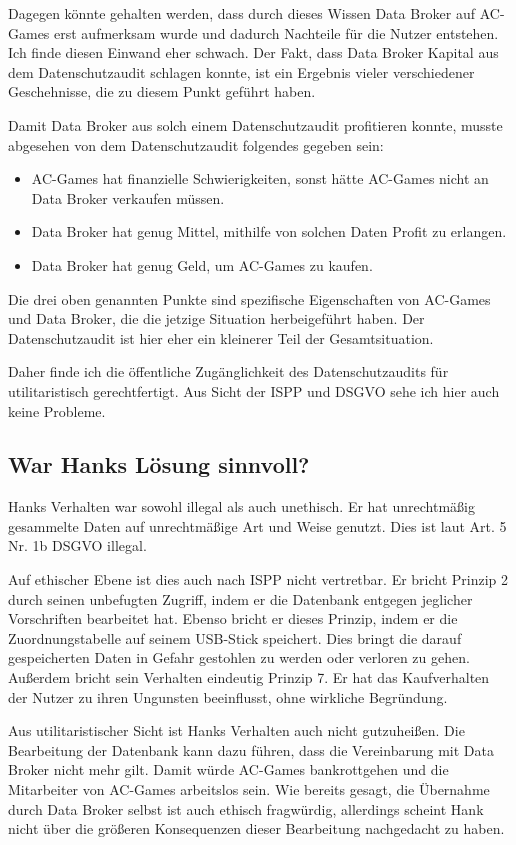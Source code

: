 Dagegen könnte gehalten werden, dass durch dieses Wissen Data Broker auf AC-Games erst aufmerksam wurde und dadurch Nachteile für die Nutzer entstehen. Ich finde diesen Einwand eher schwach. Der Fakt, dass Data Broker Kapital aus dem Datenschutzaudit schlagen konnte, ist ein Ergebnis vieler verschiedener Geschehnisse, die zu diesem Punkt geführt haben.

Damit Data Broker aus solch einem Datenschutzaudit profitieren konnte, musste abgesehen von dem Datenschutzaudit folgendes gegeben sein:
\begin{itemize}
    \item AC-Games hat finanzielle Schwierigkeiten, sonst hätte AC-Games nicht an Data Broker verkaufen müssen. 
    \item Data Broker hat genug Mittel, mithilfe von solchen Daten Profit zu erlangen.
    \item Data Broker hat genug Geld, um AC-Games zu kaufen.
\end{itemize}
Die drei oben genannten Punkte sind spezifische Eigenschaften von AC-Games und Data Broker, die die jetzige Situation herbeigeführt haben. 
Der Datenschutzaudit ist hier eher ein kleinerer Teil der Gesamtsituation.

Daher finde ich die öffentliche Zugänglichkeit des Datenschutzaudits für utilitaristisch gerechtfertigt. Aus Sicht der ISPP und DSGVO sehe ich hier auch keine Probleme.

\subsection*{War Hanks Lösung sinnvoll? \cite{kees_faites_2017}}

Hanks Verhalten war sowohl illegal als auch unethisch.
Er hat unrechtmäßig gesammelte Daten auf unrechtmäßige Art und Weise genutzt.
Dies ist laut Art. 5 Nr. 1b DSGVO illegal.

Auf ethischer Ebene ist dies auch nach ISPP nicht vertretbar.
Er bricht Prinzip 2 durch seinen unbefugten Zugriff, indem er die Datenbank entgegen jeglicher Vorschriften bearbeitet hat. Ebenso bricht er dieses Prinzip, indem er die Zuordnungstabelle auf seinem USB-Stick speichert.
Dies bringt die darauf gespeicherten Daten in Gefahr gestohlen zu werden oder verloren zu gehen.
Außerdem bricht sein Verhalten eindeutig Prinzip 7.
Er hat das Kaufverhalten der Nutzer zu ihren Ungunsten beeinflusst, ohne wirkliche Begründung.

Aus utilitaristischer Sicht ist Hanks Verhalten auch nicht gutzuheißen.
Die Bearbeitung der Datenbank kann dazu führen, dass die Vereinbarung mit Data Broker nicht mehr gilt. Damit würde AC-Games bankrottgehen und die Mitarbeiter von AC-Games arbeitslos sein.
Wie bereits gesagt, die Übernahme durch Data Broker selbst ist auch ethisch fragwürdig, allerdings scheint Hank nicht über die größeren Konsequenzen dieser Bearbeitung nachgedacht zu haben.

